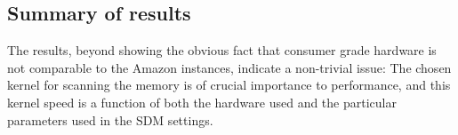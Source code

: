 \subsection{Summary of results}

The results, beyond showing the obvious fact that consumer grade hardware is not comparable to the Amazon instances, indicate a non-trivial issue:  The chosen kernel for scanning the memory is of crucial importance to performance, and this kernel speed is a function of both the hardware used and the particular parameters used in the SDM settings.
